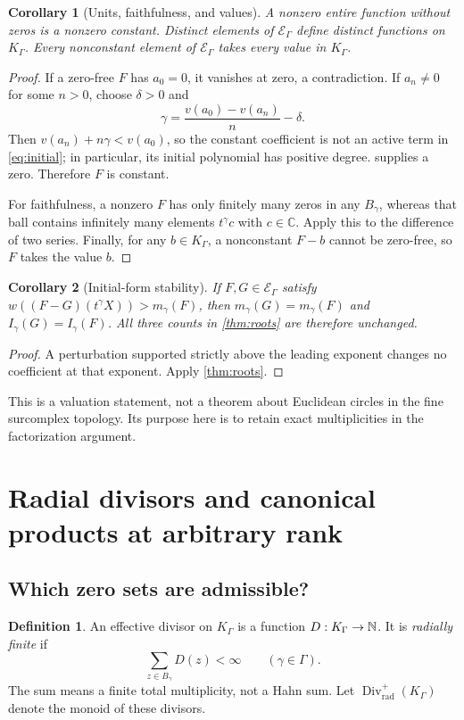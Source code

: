 \documentclass[11pt]{article}
\theoremstyle{plain}
\theoremstyle{plain}
\theoremstyle{plain}
\newtheorem{corollary}[corollary]{Corollary}
\theoremstyle{definition}
\newtheorem{definition}[definition]{Definition}
\theoremstyle{definition}
\theoremstyle{definition}
\theoremstyle{remark}
\newcommand{\C}{\mathbb C}\newcommand{\R}{\mathbb R}
\newcommand{\K}{K_\Gamma}\newcommand{\E}{\mathcal E_\Gamma}
\DeclareMathOperator{\Div}{Div}\DeclareMathOperator{\inpol}{in}
\begin{document}
\begin{corollary}[Units, faithfulness, and values]\label{cor:units}
A nonzero entire function without zeros is a nonzero constant.
Distinct elements of $\E$ define distinct functions on $\K$.
Every nonconstant element of $\E$ takes every value in $\K$.
\end{corollary}
\begin{proof}
If a zero-free $F$ has $a_0=0$, it vanishes at zero, a contradiction.
If $a_n\ne0$ for some $n>0$, choose $\delta>0$ and
\[
 \gamma=\frac{v(a_0)-v(a_n)}{n}-\delta.
\]
Then $v(a_n)+n\gamma<v(a_0)$, so the constant coefficient is not an
active term in \eqref{eq:initial}; in particular, its initial polynomial
has positive degree.  supplies a zero. Therefore $F$
is constant.

For faithfulness, a nonzero $F$ has only finitely many zeros in any
$B_\gamma$, whereas that ball contains infinitely many elements
$t^\gamma c$ with $c\in\C$. Apply this to the difference of two series.
Finally, for any $b\in\K$, a nonconstant $F-b$ cannot be zero-free,
so $F$ takes the value $b$.
\end{proof}

\begin{corollary}[Initial-form stability]\label{cor:stability}
If $F,G\in\E$ satisfy
$w((F-G)(t^\gamma X))>m_\gamma(F)$, then
$m_\gamma(G)=m_\gamma(F)$ and $I_\gamma(G)=I_\gamma(F)$.
All three counts in \cref{thm:roots} are therefore unchanged.
\end{corollary}
\begin{proof}
A perturbation supported strictly above the leading exponent changes
no coefficient at that exponent. Apply \cref{thm:roots}.
\end{proof}

This is a valuation statement, not a theorem about Euclidean circles
in the fine surcomplex topology. Its purpose here is to retain exact
multiplicities in the factorization argument.

\section{Radial divisors and canonical products at arbitrary rank}
\label{sec:products}

\subsection{Which zero sets are admissible?}
\begin{definition}
An effective divisor on $\K$ is a function $D:\K\to\N$.
It is \emph{radially finite} if
\[
 \sum_{z\in B_\gamma}D(z)<\infty\qquad(\gamma\in\Gamma).
\]
The sum means a finite total multiplicity, not a Hahn sum.
Let $\Div^+_{\mathrm{rad}}(\K)$ denote the monoid of these divisors.
\end{definition}
\end{document}

